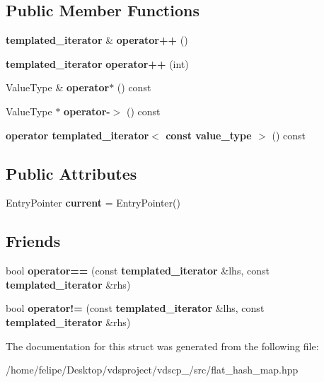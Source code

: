 \subsection*{Public Member Functions}
\begin{DoxyCompactItemize}
\item 
{\bf templated\+\_\+iterator} \& {\bfseries operator++} ()\label{structska_1_1detailv3_1_1sherwood__v3__table_1_1templated__iterator_ae2a915085c4b6c2a9c49052473463782}

\item 
{\bf templated\+\_\+iterator} {\bfseries operator++} (int)\label{structska_1_1detailv3_1_1sherwood__v3__table_1_1templated__iterator_a0abeb60414eddc1c05c44294be92a2a6}

\item 
Value\+Type \& {\bfseries operator$\ast$} () const \label{structska_1_1detailv3_1_1sherwood__v3__table_1_1templated__iterator_a48db2a1e7d3d66238c644af66691c85b}

\item 
Value\+Type $\ast$ {\bfseries operator-\/$>$} () const \label{structska_1_1detailv3_1_1sherwood__v3__table_1_1templated__iterator_aab3e2443f9c8f7b24b61ff58533c4519}

\item 
{\bfseries operator templated\+\_\+iterator$<$ const value\+\_\+type $>$} () const \label{structska_1_1detailv3_1_1sherwood__v3__table_1_1templated__iterator_ace521f6a78b76532bbd1a9ce94bc62c4}

\end{DoxyCompactItemize}
\subsection*{Public Attributes}
\begin{DoxyCompactItemize}
\item 
Entry\+Pointer {\bfseries current} = Entry\+Pointer()\label{structska_1_1detailv3_1_1sherwood__v3__table_1_1templated__iterator_a8537396973141815a65488447b1aa627}

\end{DoxyCompactItemize}
\subsection*{Friends}
\begin{DoxyCompactItemize}
\item 
bool {\bfseries operator==} (const {\bf templated\+\_\+iterator} \&lhs, const {\bf templated\+\_\+iterator} \&rhs)\label{structska_1_1detailv3_1_1sherwood__v3__table_1_1templated__iterator_a4f593a758a735615a7b8775a829d907b}

\item 
bool {\bfseries operator!=} (const {\bf templated\+\_\+iterator} \&lhs, const {\bf templated\+\_\+iterator} \&rhs)\label{structska_1_1detailv3_1_1sherwood__v3__table_1_1templated__iterator_adba9c494ff40b17dd700f1d612ce196a}

\end{DoxyCompactItemize}


The documentation for this struct was generated from the following file\+:\begin{DoxyCompactItemize}
\item 
/home/felipe/\+Desktop/vdsproject/vdscp\+\_/src/flat\+\_\+hash\+\_\+map.\+hpp\end{DoxyCompactItemize}
